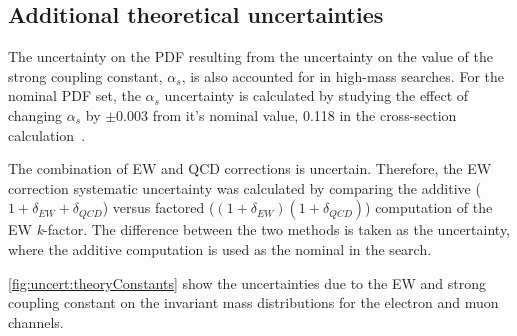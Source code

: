 \subsection{Additional theoretical uncertainties}
The uncertainty on the PDF resulting from the uncertainty on the value of the strong coupling constant, $\alpha_s$, is also accounted for in high-mass searches. For the nominal PDF set, the $\alpha_s$ uncertainty is calculated by studying the effect of changing $\alpha_s$ by $\pm 0.003$ from it's nominal value, 0.118 in the cross-section calculation~\cite{Butterworth_2016}.

The combination of EW and QCD corrections is uncertain. Therefore, the EW correction systematic uncertainty was calculated by comparing the additive ($1 + \delta_{EW} + \delta_{QCD}$) versus factored ($(1 + \delta_{EW})(1 + \delta_{QCD})$) computation of the EW \emph{k}-factor. The difference between the two methods is taken as the uncertainty, where the additive computation is used as the nominal in the search. 

\cref{fig:uncert:theoryConstants} show the uncertainties due to the EW and strong coupling constant on the invariant mass distributions for the electron and muon channels. 

